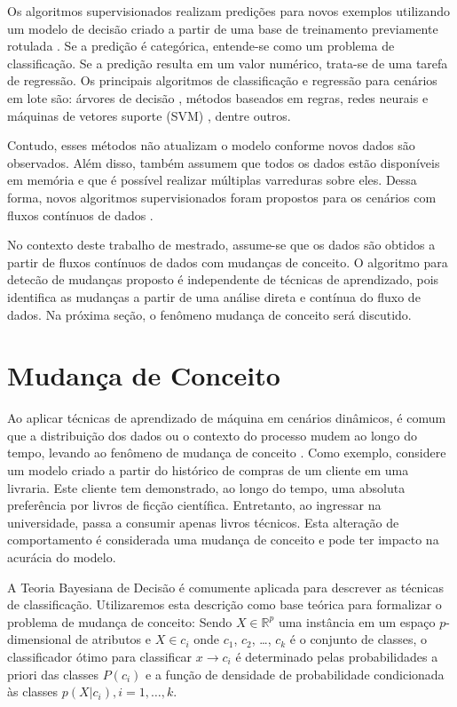 \documentclass[qual, classic, a4paper]{ufbathesis}
\begin{document}
Os algoritmos supervisionados realizam predições para novos exemplos utilizando um modelo de decisão criado a partir de uma base de treinamento previamente rotulada \cite{Kotsiantis:2007:SML:1566770.1566773}.
Se a predição é categórica, entende-se como um problema de classificação.
Se a predição resulta em um valor numérico, trata-se de uma tarefa de regressão.
Os principais algoritmos de classificação e regressão para cenários em lote são:
árvores de decisão \cite{Breiman:Classification_Regression_Trees},
métodos baseados em regras, 
redes neurais e máquinas de vetores suporte (SVM) \cite{Vapnik1998}, 
dentre outros.

Contudo, esses métodos não atualizam o modelo conforme novos dados são observados.
Além disso, também assumem que todos os dados estão disponíveis em memória e que é possível realizar múltiplas varreduras sobre eles.
Dessa forma, novos algoritmos supervisionados foram propostos para os cenários com fluxos contínuos de dados \cite{Domingos:2000:MHD:347090.347107, Bifet:2013:EDS:2480362.2480516, Wang:2003:MCD:956750.956778, Aggarwal:2004:DCD:1014052.1014110, Gama:2003:ADT:956750.956813}.

No contexto deste trabalho de mestrado, assume-se que os dados são obtidos a partir de fluxos contínuos de dados com mudanças de conceito.
O algoritmo para detecão de mudanças proposto é independente de técnicas de aprendizado, 
pois identifica as mudanças a partir de uma análise direta e contínua do fluxo de dados.
Na próxima seção, o fenômeno mudança de conceito será discutido.

\section{Mudança de Conceito}
\label{sec:mudanca_de_conceito}

Ao aplicar técnicas de aprendizado de máquina em cenários dinâmicos, é comum que a distribuição dos dados ou o contexto do processo mudem ao longo do tempo, levando ao fenômeno de mudança de conceito \cite{Schlimmer1986}.
Como exemplo, considere um modelo criado a partir do histórico de compras de um cliente em uma livraria.
Este cliente tem demonstrado, ao longo do tempo, uma absoluta preferência por livros de ficção científica.
Entretanto, ao ingressar na universidade, passa a consumir apenas livros técnicos.
Esta alteração de comportamento é considerada uma mudança de conceito e pode ter impacto na acurácia do modelo.

A Teoria Bayesiana de Decisão \cite{Duda:2000:PC:954544} é comumente aplicada para descrever as técnicas de classificação.
Utilizaremos esta descrição como base teórica para formalizar o problema de mudança de conceito:
Sendo $X \in \mathbb{R}^p$ uma instância em um espaço $p$-dimensional de atributos e $X \in c_i$ onde $c_1$, $c_2$, \ldots, $c_k$ é o conjunto de classes, 
o classificador ótimo para classificar $x \rightarrow c_i$ é determinado pelas probabilidades a priori das classes $P(c_i)$ e a função de densidade de probabilidade condicionada às classes $p(X|c_i), i = 1, \ldots, k$.
\end{document}
